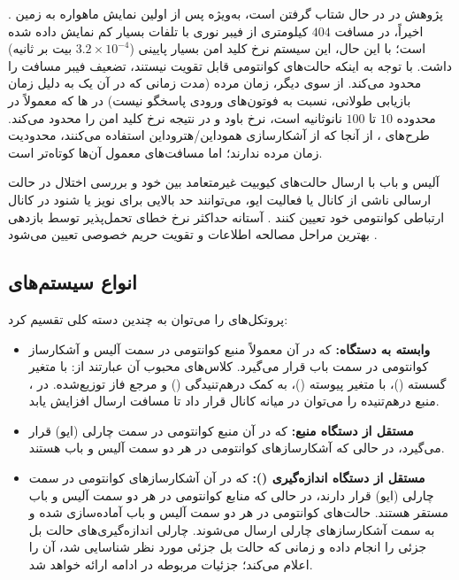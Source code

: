 پژوهش در  در حال شتاب گرفتن است، به‌ویژه پس از اولین نمایش  ماهواره به زمین \cite{7-20}. اخیراً،  در مسافت $404$ کیلومتری از فیبر نوری با تلفات بسیار کم نمایش داده شده است؛ با این حال، این سیستم نرخ کلید امن بسیار پایینی ($3.2 \times 10^{-4}$ بیت بر ثانیه) داشت. با توجه به اینکه حالت‌های کوانتومی قابل تقویت نیستند، تضعیف فیبر مسافت را محدود می‌کند. از سوی دیگر، زمان مرده (مدت زمانی که در آن یک  به دلیل زمان بازیابی طولانی، نسبت به فوتون‌های ورودی پاسخگو نیست) در ها که معمولاً در محدوده $10$ تا $100$ نانوثانیه است، نرخ باود و در نتیجه نرخ کلید امن را محدود می‌کند. طرح‌های ، از آنجا که از آشکارسازی هموداین/هتروداین استفاده می‌کنند، محدودیت زمان مرده ندارند؛ اما مسافت‌های معمول آن‌ها کوتاه‌تر است.

آلیس و باب با ارسال حالت‌های کیوبیت غیرمتعامد بین خود و بررسی اختلال در حالت ارسالی ناشی از کانال یا فعالیت ایو، می‌توانند حد بالایی برای نویز یا شنود در کانال ارتباطی کوانتومی خود تعیین کنند \cite{7-6}. آستانه حداکثر نرخ خطای تحمل‌پذیر توسط بازدهی بهترین مراحل مصالحه اطلاعات و تقویت حریم خصوصی تعیین می‌شود \cite{7-6}.




\subsection{انواع سیستم‌های }
\label{subsec:7-2-1}
پروتکل‌های  را می‌توان به چندین دسته کلی تقسیم کرد:
\begin{itemize}
	\item \textbf{ وابسته به دستگاه:} که در آن معمولاً منبع کوانتومی در سمت آلیس و آشکارساز کوانتومی در سمت باب قرار می‌گیرد. کلاس‌های محبوب آن عبارتند از:  با متغیر گسسته ()،  با متغیر پیوسته ()،  به کمک درهم‌تنیدگی () و مرجع فاز توزیع‌شده. در ، منبع درهم‌تنیده را می‌توان در میانه کانال قرار داد تا مسافت ارسال افزایش یابد.
	\item \textbf{ مستقل از دستگاه منبع:} که در آن منبع کوانتومی در سمت چارلی (ایو) قرار می‌گیرد، در حالی که آشکارسازهای کوانتومی در هر دو سمت آلیس و باب هستند.
	\item \textbf{ مستقل از دستگاه اندازه‌گیری ():} که در آن آشکارسازهای کوانتومی در سمت چارلی (ایو) قرار دارند، در حالی که منابع کوانتومی در هر دو سمت آلیس و باب مستقر هستند. حالت‌های کوانتومی در هر دو سمت آلیس و باب آماده‌سازی شده و به سمت آشکارسازهای چارلی ارسال می‌شوند. چارلی اندازه‌گیری‌های حالت بل جزئی را انجام داده و زمانی که حالت بل جزئی مورد نظر شناسایی شد، آن را اعلام می‌کند؛ جزئیات مربوطه در ادامه ارائه خواهد شد.
\end{itemize}








